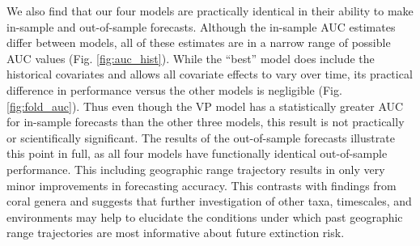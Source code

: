 \documentclass[12pt,letterpaper]{article}
\begin{document}
\begin{refsection}

We also find that our four models are practically identical in their ability to make in-sample and out-of-sample forecasts. Although the in-sample AUC estimates differ between models, all of these estimates are in a narrow range of possible AUC values (Fig. \ref{fig:auc_hist}). While the ``best'' model does include the historical covariates and allows all covariate effects to vary over time, its practical difference in performance versus the other models is negligible (Fig. \ref{fig:fold_auc}). Thus even though the VP model has a statistically greater AUC for in-sample forecasts than the other three models, this result is not practically or scientifically significant. The results of the out-of-sample forecasts illustrate this point in full, as all four models have functionally identical out-of-sample performance. This including geographic range trajectory results in only very minor improvements in forecasting accuracy. This contrasts with findings from coral genera \citep{Kiessling2016} and suggests that further investigation of other taxa, timescales, and environments may help to elucidate the conditions under which past geographic range trajectories are most informative about future extinction risk.



\end{refsection}
\end{document}
